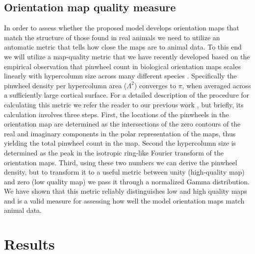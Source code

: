 \documentclass[utf8]{frontiersSCNS}
\begin{document}
\subsection{Orientation map quality measure}

In order to assess whether the proposed model develops orientation maps that match the structure of those found in real 
animals we need to utilize an automatic metric that tells how close the maps are to animal data. To this end we will 
utilize a map-quality metric that we have recently developed \citep{Stevens2013} based on the empirical observation that pinwheel count 
in biological orientation maps scales linearly with hypercolumn size across many different species \citep{Kaschube2010}.
Specifically the pinwheel density per hypercolumn area ($\Lambda^2$) converges to $\pi$, when averaged across a sufficiently 
large cortical surface. For a detailed description of the procedure for calculating this metric we refer the reader to 
our previous work \citep{Stevens2013}, but briefly, its calculation involves three steps. First, the locations of the pinwheels
in the orientation map are determined as the intersections of the zero contours of the real and imaginary 
components in the polar representation of the maps, thus yielding the total pinwheel count in the map. Second the 
hypercolumn size is determined as the peak in the isotropic ring-like Fourier transform of the orientation maps.
Third, using these two numbers we can derive the pinwheel density, but to transform it to a useful metric between 
unity (high-quality map) and zero (low quality map) we pass it through a normalized Gamma distribution. 
We have shown that this metric reliably distinguishes low and high quality maps \citep{Stevens2013}
and is a valid measure for assessing how well the model orientation maps match animal data.

\section{Results}
\end{document}
